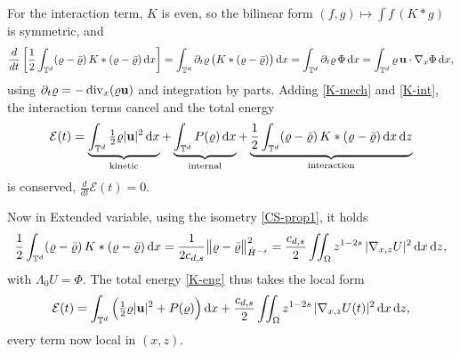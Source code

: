 \documentclass[12pt,a4paper,twoside]{article}
\newcommand{\Div}{\operatorname{div}}
\newcommand{\vr}{\varrho}
\newcommand{\vu}{\vc{u}}
\newcommand{\vc}[1]{{\bf #1}}
\newcommand{\Grad}{\nabla}
\newcommand{\dx}{{\,\rm d} {x}}
\numberwithin{equation}{section}%
\newcommand{\dz}{{\rm d} z}
\begin{document}
For the interaction term, $K$ is even, so the bilinear form $(f,g)\mapsto\int f\,(K\ast g)$ is symmetric, and
\begin{equation}\label{K-int}
	\frac{d}{dt}\left[\frac12\int_{\mathbb T^d}(\vr-\bar\vr)\,K\ast(\vr-\bar\vr) \dx\right]
	= \int_{\mathbb T^d}\partial_t\vr\,\big(K\ast(\vr-\bar\vr)\big)  \dx
	= \int_{\mathbb T^d}\partial_t\vr\,\Phi  \dx
	= \int_{\mathbb T^d}\vr\,\vu\cdot\Grad_x\Phi  \dx,
\end{equation}
using $\partial_t\vr=-\Div_x(\vr\vu)$ and integration by parts. Adding \eqref{K-mech} and \eqref{K-int}, the interaction terms cancel and the total energy
\begin{equation}\label{K-eng}
	\mathcal E(t) = \underbrace{\int_{\mathbb T^d}\tfrac12\vr|\vu|^2 \dx}_{\text{kinetic}}
	+ \underbrace{\int_{\mathbb T^d} P(\vr) \dx}_{\text{internal}}
	+ \underbrace{\frac12\int_{\mathbb T^d}(\vr-\bar\vr)\,K\ast(\vr-\bar\vr) \dx\,\dz}_{\text{interaction}}
\end{equation}
is conserved, $\tfrac{d}{dt}\mathcal E(t)=0$.\par 

Now in Extended variable, using  the isometry \eqref{CS-prop1}, it holds 
\begin{equation*}
	\frac12\int_{\mathbb T^d}(\vr-\bar\vr)\,K\ast(\vr-\bar\vr)  \dx
	= \frac{1}{2c_{d,s}}\big\|\vr-\bar\vr\big\|_{\dot H^{-s}}^2
	= \frac{c_{d,s}}2\iint_\Omega z^{1-2s}\,|\Grad_{x,z}U|^2 \dx \, \dz  ,
\end{equation*}
with $\Lambda_0 U=\Phi$. The total energy \eqref{K-eng} thus takes the local form
\begin{equation}\label{en_def_ext}
	\mathcal E(t) = \int_{\mathbb T^d}\Big(\tfrac12\vr|\vu|^2 + P(\vr)\Big) \dx 
	+ \frac{c_{d,s}}2\iint_\Omega z^{1-2s}\,|\Grad_{x,z}U(t)|^2 \dx \,\dz ,
\end{equation}
every term now local in $(x,z)$. \par 
\end{document}
